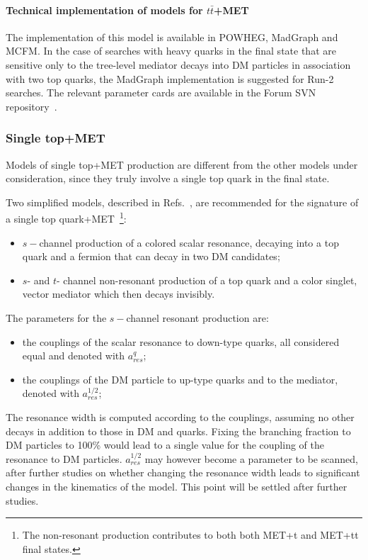 \documentclass[a4,debug,notitlepage,nobib]{tufte-handout}
\begin{document}
\paragraph{Technical implementation of models for $t \bar{t}$+MET}

The implementation of this model is available in POWHEG, MadGraph
and MCFM. In the case of searches with heavy quarks in the final state
that are sensitive only to the tree-level mediator decays into DM particles
in association with two top quarks, the MadGraph implementation is suggested
for Run-2 searches. The relevant parameter cards are available in the Forum 
SVN repository~\cite{ForumSVN_DMTTBar}.


\subsubsection{Single top+MET}

Models of single top+MET production are different from the other models under consideration, 
since they truly involve a single top quark in the final state.

Two simplified models, described in Refs.~\cite{Andrea:2011ws,Boucheneb:2014wza}, are recommended 
for the signature of a single top quark+MET~\footnote{The non-resonant production 
contributes to both both MET+t and MET+tt final states.}:

\begin{itemize}
\item $s-$channel production of a colored scalar resonance, decaying into a top quark and a fermion
that can decay in two DM candidates;
\item $s$- and $t$- channel non-resonant production of a top quark and a color singlet, vector mediator which then decays invisibly.
\end{itemize}

The parameters for the $s-$channel resonant production are:
\begin{itemize}
 \item the couplings of the scalar resonance to down-type quarks, all considered equal and denoted with $a_{res}^q$;
 \item the couplings of the DM particle to up-type quarks and to the mediator, denoted with $a_{res}^{1/2}$;
\end{itemize}
The resonance width is computed according to the couplings, assuming no other decays in addition
to those in DM and quarks. Fixing the branching fraction to DM particles to 100\% would lead 
to a single value for the coupling of the resonance to DM particles. $a_{res}^{1/2}$ 
may however become a parameter to be scanned, after further studies on whether changing 
the resonance width leads to significant changes in the kinematics of the model. 
This point will be settled after further studies. 
\end{document}

